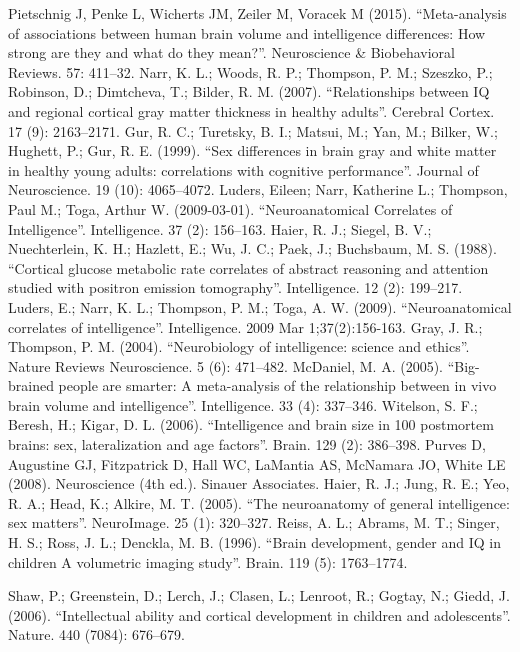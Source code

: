 \documentclass[conference]{IEEEtran}
\begin{document}
\begin{thebibliography}{00}
 Pietschnig J, Penke L, Wicherts JM, Zeiler M, Voracek M (2015). ``Meta-analysis of associations between human brain volume and intelligence differences: How strong are they and what do they mean?''. Neuroscience \& Biobehavioral Reviews. 57: 411–32.
 Narr, K. L.; Woods, R. P.; Thompson, P. M.; Szeszko, P.; Robinson, D.; Dimtcheva, T.; Bilder, R. M. (2007). ``Relationships between IQ and regional cortical gray matter thickness in healthy adults''. Cerebral Cortex. 17 (9): 2163–2171.
 Gur, R. C.; Turetsky, B. I.; Matsui, M.; Yan, M.; Bilker, W.; Hughett, P.; Gur, R. E. (1999). ``Sex differences in brain gray and white matter in healthy young adults: correlations with cognitive performance''. Journal of Neuroscience. 19 (10): 4065–4072.
 Luders, Eileen; Narr, Katherine L.; Thompson, Paul M.; Toga, Arthur W. (2009-03-01). ``Neuroanatomical Correlates of Intelligence''. Intelligence. 37 (2): 156–163.
 Haier, R. J.; Siegel, B. V.; Nuechterlein, K. H.; Hazlett, E.; Wu, J. C.; Paek, J.; Buchsbaum, M. S. (1988). ``Cortical glucose metabolic rate correlates of abstract reasoning and attention studied with positron emission tomography''. Intelligence. 12 (2): 199–217.
 Luders, E.; Narr, K. L.; Thompson, P. M.; Toga, A. W. (2009). ``Neuroanatomical correlates of intelligence''. Intelligence. 2009 Mar 1;37(2):156-163.   %
 Gray, J. R.; Thompson, P. M. (2004). ``Neurobiology of intelligence: science and ethics''. Nature Reviews Neuroscience. 5 (6): 471–482.
 McDaniel, M. A. (2005). ``Big-brained people are smarter: A meta-analysis of the relationship between in vivo brain volume and intelligence''. Intelligence. 33 (4): 337–346.
 Witelson, S. F.; Beresh, H.; Kigar, D. L. (2006). ``Intelligence and brain size in 100 postmortem brains: sex, lateralization and age factors''. Brain. 129 (2): 386–398.
 Purves D, Augustine GJ, Fitzpatrick D, Hall WC, LaMantia AS, McNamara JO, White LE (2008). Neuroscience (4th ed.). Sinauer Associates.
 Haier, R. J.; Jung, R. E.; Yeo, R. A.; Head, K.; Alkire, M. T. (2005). ``The neuroanatomy of general intelligence: sex matters''. NeuroImage. 25 (1): 320–327.
 Reiss, A. L.; Abrams, M. T.; Singer, H. S.; Ross, J. L.; Denckla, M. B. (1996). ``Brain development, gender and IQ in children A volumetric imaging study''. Brain. 119 (5): 1763–1774.

Shaw, P.; Greenstein, D.; Lerch, J.; Clasen, L.; Lenroot, R.; Gogtay, N.; Giedd, J. (2006). ``Intellectual ability and cortical development in children and adolescents''. Nature. 440 (7084): 676–679.


\end{thebibliography}
\end{document}
